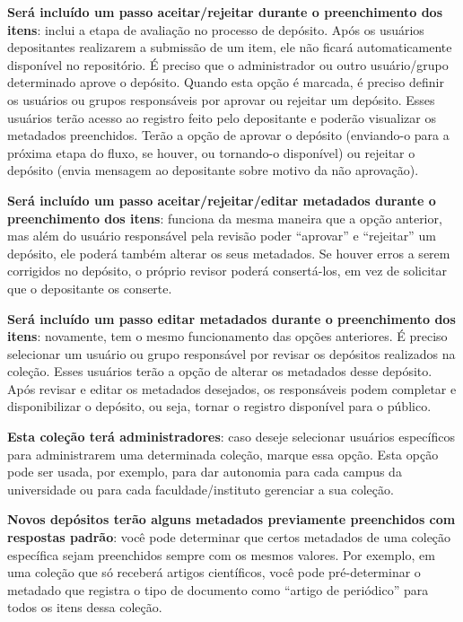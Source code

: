 \documentclass[12pt,hidelinks]{article}
\begin{document}
    \textbf{Será incluído um passo aceitar/rejeitar durante o preenchimento dos itens}: inclui a etapa de avaliação no processo de depósito. Após os usuários depositantes realizarem a submissão de um item, ele não ficará automaticamente disponível no repositório. É preciso que o administrador ou outro usuário/grupo determinado aprove o depósito. Quando esta opção é marcada, é preciso definir os usuários ou grupos responsáveis por aprovar ou rejeitar um depósito. Esses usuários terão acesso ao registro feito pelo depositante e poderão visualizar os metadados preenchidos. Terão a opção de aprovar o depósito (enviando-o para a próxima etapa do fluxo, se houver, ou tornando-o disponível) ou rejeitar o depósito (envia mensagem ao depositante sobre motivo da não aprovação).
    
    \singlespacing
    
    \textbf{Será incluído um passo aceitar/rejeitar/editar metadados durante o preenchimento dos itens}: funciona da mesma maneira que a opção anterior, mas além do usuário responsável pela revisão poder “aprovar” e “rejeitar” um depósito, ele poderá também alterar os seus metadados. Se houver erros a serem corrigidos no depósito, o próprio revisor poderá consertá-los, em vez de solicitar que o depositante os conserte.
    
\newpage
    
    \textbf{Será incluído um passo editar metadados durante o preenchimento dos itens}: novamente, tem o mesmo funcionamento das opções anteriores. É preciso selecionar um usuário ou grupo responsável por revisar os depósitos realizados na coleção. Esses usuários terão a opção de alterar os metadados desse depósito. Após revisar e editar os metadados desejados, os responsáveis podem completar e disponibilizar o depósito, ou seja, tornar o registro disponível para o público.
    
    \singlespacing
    
    \textbf{Esta coleção terá administradores}: caso deseje selecionar usuários específicos para administrarem uma determinada coleção, marque essa opção. Esta opção pode ser usada, por exemplo, para dar autonomia para cada campus da universidade ou para cada faculdade/instituto gerenciar a sua coleção.
    
    \singlespacing
    
    \textbf{Novos depósitos terão alguns metadados previamente preenchidos com respostas padrão}: você pode determinar que certos metadados de uma coleção específica sejam preenchidos sempre com os mesmos valores. Por exemplo, em uma coleção que só receberá artigos científicos, você pode pré-determinar o metadado que registra o tipo de documento como “artigo de periódico” para todos os itens dessa coleção.
    
\end{document}
